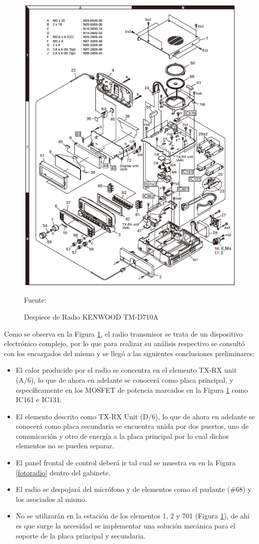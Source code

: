 \begin{figure}[H]
\centering
\includegraphics[scale=1.25]{Figuras/Despiece.png}
\caption{Despiece de Radio KENWOOD TM-D710A}
Fuente:\cite{manual}
\label{despiece}
\end{figure}

Como se observa en la Figura \ref{despiece}, el radio transmisor se trata de un dispositivo electrónico complejo, por lo que para realizar su análisis respectivo se consultó con los encargados del mismo y se llegó a las siguientes conclusiones preliminares:

\begin{itemize}
    \item El calor producido por el radio se concentra en el elemento TX-RX unit (A/6), lo que de ahora en adelante se conocerá como placa principal, y específicamente en los MOSFET de potencia marcados en la Figura \ref{despiece} como IC161 e IC131.
    \item El elemento descrito como TX-RX Unit (D/6), lo que de ahora en adelante se conocerá como placa secundaria se encuentra unida por dos puertos, uno de comunicación y otro de energía a la placa principal por lo cual dichos elementos no se pueden separar.
    \item El panel frontal de control deberá ir tal cual se muestra en en la Figura \ref{fotoradio} dentro del gabinete.
    \item El radio se despojará del micrófono y de elementos como el parlante (\#68) y los asociados al mismo.
    \item No se utilizarán en la estación de los elementos 1, 2 y 701 (Figura \ref{despiece}), de ahí es que surge la necesidad se implementar una solución mecánica para el soporte de la placa principal y secundaria.
\end{itemize}

